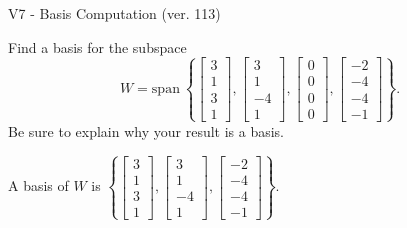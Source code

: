 \begin{exercise}
  \begin{exerciseTitle}V7 - Basis Computation (ver. 113)\end{exerciseTitle}
  \begin{exerciseStatement}
    Find a basis for the subspace 
\[W=\mathrm{span}\ \left\{\left[\begin{array}{r}
3 \\
1 \\
3 \\
1
\end{array}\right] , \left[\begin{array}{r}
3 \\
1 \\
-4 \\
1
\end{array}\right] , \left[\begin{array}{r}
0 \\
0 \\
0 \\
0
\end{array}\right] , \left[\begin{array}{r}
-2 \\
-4 \\
-4 \\
-1
\end{array}\right]\right\}.\]
 Be sure to explain why your result is a basis.


  \end{exerciseStatement}
  \begin{exerciseAnswer}
   A basis of \(W\) is  \(\left\{\left[\begin{array}{r}
3 \\
1 \\
3 \\
1
\end{array}\right] , \left[\begin{array}{r}
3 \\
1 \\
-4 \\
1
\end{array}\right] , \left[\begin{array}{r}
-2 \\
-4 \\
-4 \\
-1
\end{array}\right]\right\}\).
  


  \end{exerciseAnswer}
\end{exercise}